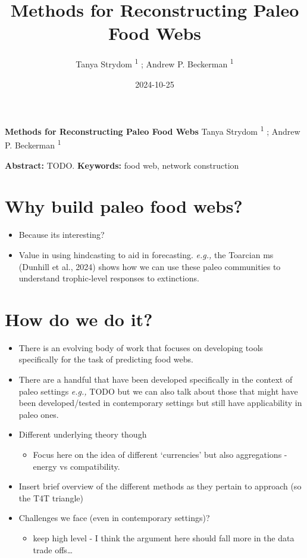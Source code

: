 \documentclass[
]{article}
\title{Methods for Reconstructing Paleo Food Webs}
\author{Tanya Strydom %
%
\textsuperscript{%
%
1%
}%
; Andrew P. Beckerman %
%
\textsuperscript{%
%
1%
}%
}
\date{2024-10-25}
\providecommand{\tightlist}{%
  \setlength{\itemsep}{0pt}\setlength{\parskip}{0pt}}\usepackage{longtable,booktabs,array}
\begin{document}
\thispagestyle{empty}
{\bfseries\sffamily\Large Methods for Reconstructing Paleo Food Webs}
\vfil
Tanya Strydom %
%
\textsuperscript{%
%
1%
}%
; Andrew P. Beckerman %
%
\textsuperscript{%
%
1%
}%

\vfil
{\small
\textbf{Abstract:} TODO.
\vfil
\textbf{Keywords:} %
food web, %
network construction%
}
\clearpage
\setcounter{page}{1}
\doublespacing
\linenumbers


\section{Why build paleo food webs?}\label{why-build-paleo-food-webs}

\begin{itemize}
\item
  Because its interesting?
\item
  Value in using hindcasting to aid in forecasting. \emph{e.g.,} the
  Toarcian ms (Dunhill et al., 2024) shows how we can use these paleo
  communities to understand trophic-level responses to extinctions.
\end{itemize}

\section{How do we do it?}\label{how-do-we-do-it}

\begin{itemize}
\item
  There is an evolving body of work that focuses on developing tools
  specifically for the task of predicting food webs.
\item
  There are a handful that have been developed specifically in the
  context of paleo settings \emph{e.g.,} TODO but we can also talk about
  those that might have been developed/tested in contemporary settings
  but still have applicability in paleo ones.
\item
  Different underlying theory though

  \begin{itemize}
  \tightlist
  \item
    Focus here on the idea of different `currencies' but also
    aggregations - energy vs compatibility.
  \end{itemize}
\item
  Insert brief overview of the different methods as they pertain to
  approach (so the T4T triangle)
\item
  Challenges we face (even in contemporary settings)?

  \begin{itemize}
  \tightlist
  \item
    keep high level - I think the argument here should fall more in the
    data trade offs\ldots{}
  \end{itemize}
\end{itemize}
\end{document}
